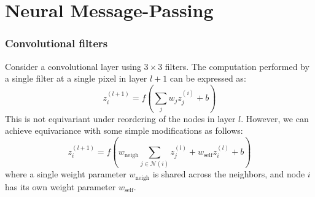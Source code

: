\documentclass{beamer}
\begin{document}
\section{Neural Message-Passing}

\begin{frame}
    \frametitle{Convolutional filters}
    Consider a convolutional layer using $3\times{}3$ filters. The computation performed by a single filter at a single pixel in layer $l+1$ can be expressed as:
    \begin{equation*}
        z^{(l+1)}_{i}=f(\sum_{j}w_{j}z^{(i)}_{j}+b)
    \end{equation*}
    This is not equivariant under reordering of the nodes in layer $l$. However, we can achieve equivariance with some simple modifications as follows:
    \begin{equation*}
        z^{(l+1)}_{i}=f(w_{\textrm{neigh}}\sum_{j\in\mathcal{N}(i)}z^{(l)}_{j}+w_{\textrm{self}}z^{(l)}_{i}+b)
    \end{equation*}
    where a single weight parameter $w_{\textrm{neigh}}$ is shared across the neighbors, and node $i$ has its own weight parameter $w_{\textrm{self}}$.
\end{frame}
\end{document}
